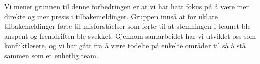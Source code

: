 Vi mener grunnen til denne forbedringen er at vi har hatt fokus på å være mer direkte og mer presis i tilbakemeldinger.
Gruppen innså at for uklare tilbakemeldinger førte til misforståelser som førte til at stemningen i teamet ble anspent og fremdriften ble
svekket. Gjennom samarbeidet har vi utviklet oss som konfliktløsere, og vi har gått fra å være todelte på enkelte områder
til så å stå sammen som et enhetlig team.